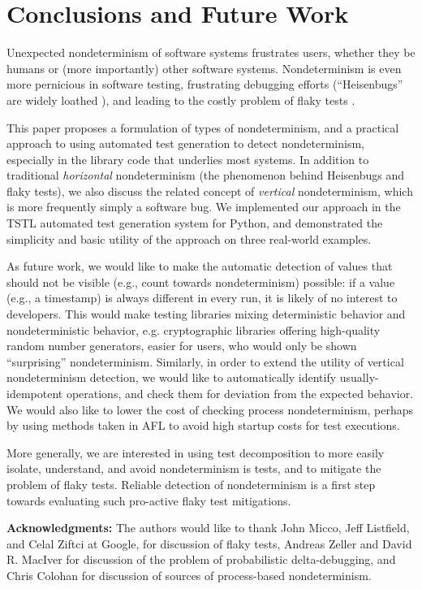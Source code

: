 \section{Conclusions and Future Work}

Unexpected nondeterminism of software systems frustrates users,
whether they be humans or (more importantly) other software systems.
Nondeterminism is even more pernicious in software testing,
frustrating debugging efforts (``Heisenbugs'' are widely loathed \cite{Heisenbug}), and
leading to the costly problem of flaky tests
\cite{miccoflaky,listfieldtestanalysis}.

This paper proposes a formulation of types of nondeterminism, and a
practical approach to using automated test generation to detect
nondeterminism, especially in the library code that underlies most
systems. In addition to traditional \emph{horizontal} nondeterminism
(the phenomenon behind Heisenbugs and flaky tests), we also discuss
the related concept of \emph{vertical} nondeterminism, which is more
frequently simply a software bug.  We implemented our approach in the
TSTL automated test generation system for Python, and demonstrated the
simplicity and basic utility of the approach on three real-world examples.

As future work, we would like to make the automatic detection of
values that should not be visible (e.g., count towards nondeterminism)
possible: if a value (e.g., a timestamp) is always different in every
run, it is likely of no interest to developers.  This would make
testing libraries mixing deterministic behavior and nondeterministic
behavior, e.g. cryptographic libraries offering high-quality random
number generators, easier for users, who would only be shown
``surprising'' nondeterminism.  Similarly, in order to extend the
utility of vertical nondeterminism detection, we would like to
automatically identify usually-idempotent operations, and check them
for deviation from the expected behavior.  We would also like to lower the cost
of checking process nondeterminism, perhaps by using methods taken in
AFL \cite{aflfuzz} to avoid high startup costs for test executions.

More generally, we are interested in using test decomposition
\cite{Composition} to more easily isolate, understand, and avoid
nondeterminism is tests, and to mitigate the problem of flaky tests.
Reliable detection of nondeterminism is a first step towards
evaluating such pro-active flaky test mitigations.

{\scriptsize {\bf Acknowledgments:}  The authors would like to thank John Micco,
Jeff Listfield, and Celal Ziftci at Google, for discussion of
flaky tests, Andreas Zeller and David R. MacIver for discussion of the
problem of probabilistic delta-debugging, and Chris
Colohan for discussion of sources of process-based nondeterminism.}